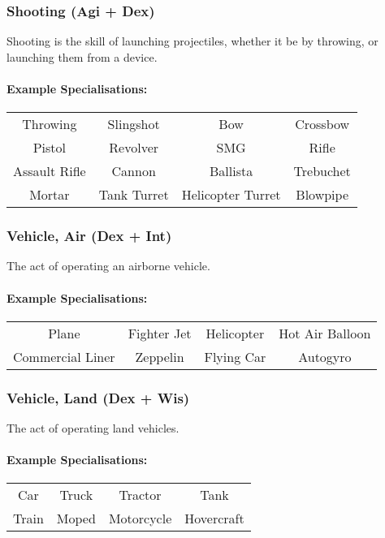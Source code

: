 \subsubsection{Shooting (Agi + Dex)}
Shooting is the skill of launching projectiles, whether it be by throwing, or launching them from a device.

\paragraph{Example Specialisations:}
\begin{center}
    \begin{tabular}{c|c|c|c}
        Throwing & Slingshot & Bow & Crossbow \\
        Pistol & Revolver & SMG & Rifle \\
        Assault Rifle & Cannon & Ballista & Trebuchet \\
        Mortar & Tank Turret & Helicopter Turret & Blowpipe
    \end{tabular}
\end{center}

\subsubsection{Vehicle, Air (Dex + Int)}
The act of operating an airborne vehicle.

\paragraph{Example Specialisations:}
\begin{center}
    \begin{tabular}{c|c|c|c}
        Plane & Fighter Jet & Helicopter & Hot Air Balloon \\
        Commercial Liner & Zeppelin & Flying Car & Autogyro\\
    \end{tabular}
\end{center}

\subsubsection{Vehicle, Land (Dex + Wis)}
The act of operating land vehicles.

\paragraph{Example Specialisations:}
\begin{center}
    \begin{tabular}{c|c|c|c}
        Car & Truck & Tractor & Tank \\
        Train & Moped & Motorcycle & Hovercraft
    \end{tabular}
\end{center}

